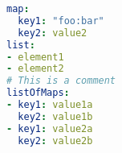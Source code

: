 
\begin{lstlisting}[language=yml,caption={GitLab \ac{CI} build file for Docker Images},breaklines=true,label={code::ci_build_yml}]
map:
  key1: "foo:bar"
  key2: value2
list:
- element1
- element2
# This is a comment
listOfMaps:
- key1: value1a
  key2: value1b
- key1: value2a
  key2: value2b


\end{lstlisting}
